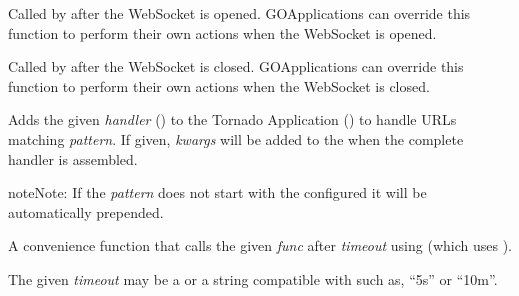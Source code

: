 \documentclass[letterpaper,10pt,openany]{sphinxmanual}
\begin{document}
\begin{fulllineitems}
\begin{fulllineitems}
\label{Developer/server:gateone.core.server.GOApplication.open}
Called by {\hyperref[Developer/server:gateone.core.server.ApplicationWebSocket.open]{}} after the WebSocket is
opened.  GOApplications can override this function to perform their own
actions when the WebSocket is opened.

\end{fulllineitems}


\begin{fulllineitems}
\label{Developer/server:gateone.core.server.GOApplication.on_close}
Called by {\hyperref[Developer/server:gateone.core.server.ApplicationWebSocket.on_close]{}} after the WebSocket is
closed.  GOApplications can override this function to perform their own
actions when the WebSocket is closed.

\end{fulllineitems}


\begin{fulllineitems}
\label{Developer/server:gateone.core.server.GOApplication.add_handler}
Adds the given \emph{handler} () to the Tornado
Application () to handle URLs matching \emph{pattern}.
If given, \emph{kwargs} will be added to the  when the
complete handler is assembled.

\begin{notice}{note}{Note:}
If the \emph{pattern} does not start with the configured  it
will be automatically prepended.
\end{notice}

\end{fulllineitems}


\begin{fulllineitems}
\label{Developer/server:gateone.core.server.GOApplication.add_timeout}
A convenience function that calls the given \emph{func} after \emph{timeout} using
 (which uses
).

The given \emph{timeout} may be a  or a string compatible
with  such as, ``5s'' or ``10m''.

\end{fulllineitems}


\end{fulllineitems}
\end{document}
